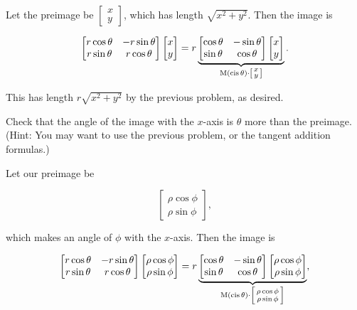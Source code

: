 \documentclass[../key.tex]{subfiles}
\begin{document}
Let the preimage be $\begin{bmatrix} x \\ y \end{bmatrix}$, which has length $\sqrt{x^2+y^2}$. Then the image is

$$\begin{bmatrix} r\cos\theta & -r\sin\theta \\ r\sin\theta & r\cos\theta \end{bmatrix}\begin{bmatrix} x \\ y \end{bmatrix} = r \underbrace{\begin{bmatrix} \cos\theta & -\sin\theta \\ \sin\theta & \cos\theta \end{bmatrix} \begin{bmatrix} x \\ y \end{bmatrix}}_{\operatorname{M}(\operatorname{cis}\theta)\cdot \left[\begin{smallmatrix} x \\ y \end{smallmatrix}\right]}.$$

This has length $r\sqrt{x^2+y^2}$ by the previous problem, as desired.

\begin{iinner_problem}
\item Check that the angle of the image with the $x$-axis is $\theta$ more than the preimage. (Hint: You may want to use the previous problem, or the tangent addition formulas.)
\end{iinner_problem}

Let our preimage be

$$\begin{bmatrix}\rho \cos\phi \\ \rho \sin\phi \end{bmatrix},$$

which makes an angle of $\phi$ with the $x$-axis. Then the image is

$$\begin{bmatrix} r\cos\theta & -r\sin\theta \\ r\sin\theta & r\cos\theta \end{bmatrix} \begin{bmatrix}\rho \cos\phi \\ \rho \sin\phi \end{bmatrix} = r\underbrace{\begin{bmatrix} \cos\theta & -\sin\theta \\ \sin\theta & \cos\theta \end{bmatrix} \begin{bmatrix}\rho \cos\phi \\ \rho \sin\phi \end{bmatrix}}_{\operatorname{M}(\operatorname{cis}\theta) \cdot \left[\begin{smallmatrix} \rho \cos\phi \\ \rho \sin\phi \end{smallmatrix} \right]},$$
\end{document}
